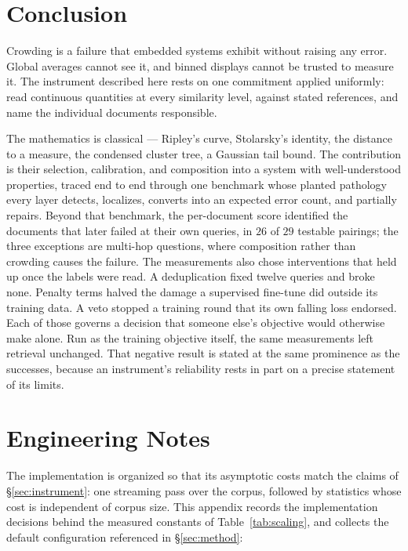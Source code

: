 \documentclass[11pt,letterpaper]{article}
\begin{document}
\section{Conclusion}

Crowding is a failure that embedded systems exhibit without raising any
error. Global averages cannot see it, and binned displays cannot be
trusted to measure it. The instrument described
here rests on one commitment applied uniformly: read continuous
quantities at every similarity level, against stated references, and
name the individual documents responsible.

The mathematics is classical --- Ripley's curve, Stolarsky's identity, the
distance to a measure, the condensed cluster tree, a Gaussian tail bound.
The contribution is their selection, calibration, and composition into a
system with well-understood properties, traced end to end through
one benchmark whose planted pathology every layer detects, localizes,
converts into an expected error count, and partially repairs. Beyond that
benchmark, the per-document score identified the documents that later
failed at their own queries, in $26$ of $29$ testable pairings; the three
exceptions are multi-hop questions, where composition rather than crowding
causes the failure. The measurements also chose interventions that held up
once the labels were read. A deduplication fixed twelve queries and broke
none. Penalty terms halved the damage a supervised fine-tune did outside
its training data. A veto stopped a training round that its own falling
loss endorsed. Each of those governs a decision that someone else's
objective would otherwise make alone. Run as the training objective
itself, the same measurements left retrieval unchanged. That negative
result is stated at the same prominence as the successes, because an
instrument's reliability rests in part on a precise statement of its
limits.

\clearpage
\appendix
\renewcommand{\thesection}{Appendix \Alph{section}}
\section{Engineering Notes}
\label{app:eng}

The implementation is organized so that its asymptotic costs match the
claims of \S\ref{sec:instrument}: one streaming pass over the corpus,
followed by statistics whose cost is independent of corpus size. This
appendix records the implementation decisions behind the measured
constants of Table~\ref{tab:scaling}, and collects the default
configuration referenced in \S\ref{sec:method}:
\end{document}
